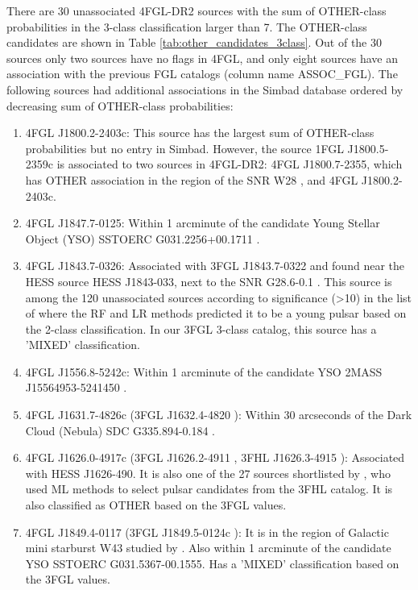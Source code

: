 There are 30 unassociated 4FGL-DR2 sources
with the sum of OTHER-class probabilities in the 3-class classification larger than 7.
The OTHER-class candidates are shown in Table \ref{tab:other_candidates_3class}.
Out of the 30 sources only two sources have no flags in 4FGL, and only eight sources have an association with the previous FGL catalogs (column name ASSOC\_FGL). 
The following sources had additional associations in the Simbad database
ordered by decreasing sum of OTHER-class probabilities:
\begin{enumerate}
\item 4FGL J1800.2-2403c: This source has the largest sum of OTHER-class probabilities but no entry in Simbad. 
However, the source 1FGL J1800.5-2359c \citep{2010ApJS..188..405A} is associated to two sources in 4FGL-DR2:
4FGL J1800.7-2355, which has OTHER association in the region of the SNR W28 \citep{2020MNRAS.495.2909R}, and 4FGL J1800.2-2403c.
\item 4FGL J1847.7-0125: Within 1 arcminute of the candidate Young Stellar Object (YSO) SSTOERC G031.2256+00.1711 \citep{2017ApJ...839..108S}.
\item 4FGL J1843.7-0326: Associated with 3FGL J1843.7-0322 and found near the HESS source HESS J1843-033, next to the SNR G28.6-0.1 \citep{2018A&A...612A...1H}. This source is
among the 120 unassociated sources according to significance (>10) in the list of \citet{2016ApJ...820....8S} where the RF and LR methods predicted it to be a young pulsar based on the 2-class classification. 
In our 3FGL 3-class catalog, this source has a 'MIXED' classification.
\item 4FGL J1556.8-5242c: Within 1 arcminute of the candidate YSO 2MASS J15564953-5241450 \citep{2008AJ....136.2413R}.
\item 4FGL J1631.7-4826c (3FGL J1632.4-4820 \citep{2015ApJS..218...23A}): Within 30 arcseconds of the Dark Cloud (Nebula) SDC G335.894-0.184 \citep{2016A&A...590A..72P}.
\item 4FGL J1626.0-4917c (3FGL J1626.2-4911 \citep{2015ApJS..218...23A}, 3FHL J1626.3-4915 \citep{2017ApJS..232...18A}): 
Associated with HESS J1626-490. It is also one of the 27 sources shortlisted by \citet{2020MNRAS.495.1093H}, 
who used ML methods to select pulsar candidates from the 3FHL catalog. It is also classified as OTHER based on the 3FGL values.
\item 4FGL J1849.4-0117 (3FGL J1849.5-0124c \citep{2015ApJS..218...23A}): It is in the region of Galactic mini starburst W43 studied by \citet{2020A&A...640A..60Y}. Also within 1 arcminute of the candidate YSO SSTOERC G031.5367-00.1555. Has a 'MIXED' classification based on the 3FGL values.

\end{enumerate}
